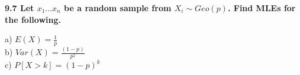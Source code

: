 \bf{9.7} Let $x_{1}...x_{n}$ be a random sample from ${ X }_{ i }\sim Geo(p)$. Find MLEs for the following.

\noindent a) $E(X)= \frac{1}{p}$\\

\noindent b) $Var(X)=\frac{(1-p)}{p^{2}}$\\

\noindent c) $P[X>k]= (1-p)^{k}$\\